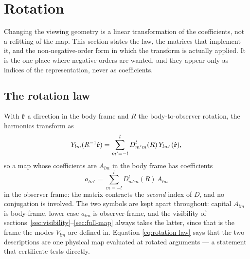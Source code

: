 
\section{Rotation}
\label{sec:wigner}

Changing the viewing geometry is a linear transformation of the coefficients, not
a refitting of the map.  This section states the law, the matrices that implement
it, and the non-negative-order form in which the transform is actually applied.
It is the one place where negative orders are wanted, and they appear only as
indices of the representation, never as coefficients.

\subsection{The rotation law}
\label{sec:rotation-law}

With $\hat{\mathbf r}$ a direction in the body frame and $R$ the body-to-observer rotation,
the harmonics transform as
\begin{equation}
  Y_{lm}(R^{-1}\hat{\mathbf r}) = \sum_{m'=-l}^{l} D^l_{m'm}(R) \, Y_{lm'}(\hat{\mathbf r}) ,
  \label{eq:rotation-law}
\end{equation}
so a map whose coefficients are $A_{lm}$ in the body frame has coefficients
\begin{equation}
  a_{lm'} = \sum_{m=-l}^{l} D^l_{m'm}(R) \, A_{lm}
  \label{eq:coefficient-rotation}
\end{equation}
in the observer frame: the matrix contracts the \emph{second} index of $D$, and no
conjugation is involved.  The two symbols are kept apart throughout: capital $A_{lm}$ is
body-frame, lower case $a_{lm}$ is observer-frame, and the visibility of
sections~\ref{sec:visibility}--\ref{sec:full-map} always takes the latter, since that is
the frame the modes $V_{lm}$ are defined in.  Equation \eqref{eq:rotation-law} says that the two
descriptions are one physical map evaluated at rotated arguments --- a statement
that certif\-icate  tests directly.

